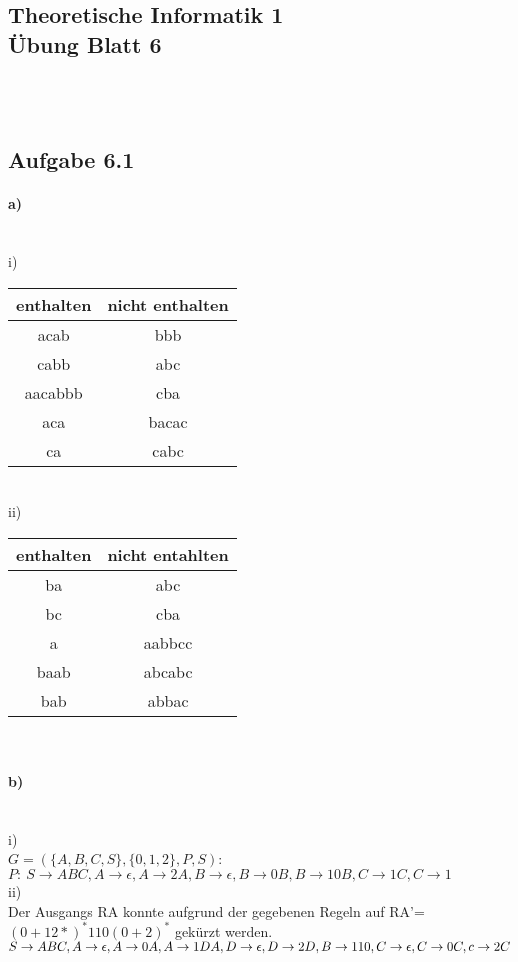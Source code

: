 \documentclass[11pt,a4paper]{article}
\begin{document}
\begin{center}
\section*{ Theoretische Informatik 1 \\ Übung Blatt 6}
\end{center}
\ \\ \ \\
\subsection*{Aufgabe 6.1}
\paragraph*{a)}\ \\
i)\\
\begin{tabular}{c|c}
enthalten & nicht enthalten\\
\hline
acab & bbb\\
cabb & abc \\
aacabbb & cba \\
aca & bacac \\
ca & cabc\\
\end{tabular}\ \\
ii)\\
\begin{tabular}{c|c}
enthalten & nicht entahlten\\
\hline
ba & abc\\
bc & cba \\
a & aabbcc\\
baab & abcabc\\
bab &  abbac\\
\end{tabular}\ \\
\paragraph*{b)}\ \\
i)\\
$G=(\{A,B,C,S\},\{0,1,2\},P,S)$:\\
$P:~S \rightarrow ABC, A \rightarrow \epsilon , A \rightarrow 2A , B \rightarrow \epsilon, B \rightarrow 0B, B \rightarrow 10B, C \rightarrow 1C, C \rightarrow 1$\\
ii)\\
Der Ausgangs RA konnte aufgrund der gegebenen Regeln auf RA'=$(0+12*)^*110(0+2)^*$ gekürzt werden.\\
$S \rightarrow ABC, A \rightarrow \epsilon, A \rightarrow 0A, A \rightarrow 1DA, D \rightarrow \epsilon, D  \rightarrow 2D, B \rightarrow 110,\\ C \rightarrow \epsilon, C \rightarrow 0C, c \rightarrow 2C$\\
\end{document}
